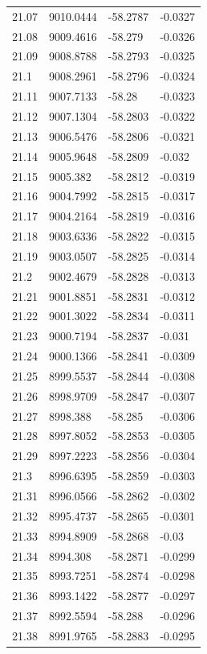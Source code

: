 \begin{table}[H]
\begin{tabular}{llll}
21.07 & 9010.0444 & -58.2787 & -0.0327 \\
21.08 & 9009.4616 & -58.279 & -0.0326 \\
21.09 & 9008.8788 & -58.2793 & -0.0325 \\
21.1 & 9008.2961 & -58.2796 & -0.0324 \\
21.11 & 9007.7133 & -58.28 & -0.0323 \\
21.12 & 9007.1304 & -58.2803 & -0.0322 \\
21.13 & 9006.5476 & -58.2806 & -0.0321 \\
21.14 & 9005.9648 & -58.2809 & -0.032 \\
21.15 & 9005.382 & -58.2812 & -0.0319 \\
21.16 & 9004.7992 & -58.2815 & -0.0317 \\
21.17 & 9004.2164 & -58.2819 & -0.0316 \\
21.18 & 9003.6336 & -58.2822 & -0.0315 \\
21.19 & 9003.0507 & -58.2825 & -0.0314 \\
21.2 & 9002.4679 & -58.2828 & -0.0313 \\
21.21 & 9001.8851 & -58.2831 & -0.0312 \\
21.22 & 9001.3022 & -58.2834 & -0.0311 \\
21.23 & 9000.7194 & -58.2837 & -0.031 \\
21.24 & 9000.1366 & -58.2841 & -0.0309 \\
21.25 & 8999.5537 & -58.2844 & -0.0308 \\
21.26 & 8998.9709 & -58.2847 & -0.0307 \\
21.27 & 8998.388 & -58.285 & -0.0306 \\
21.28 & 8997.8052 & -58.2853 & -0.0305 \\
21.29 & 8997.2223 & -58.2856 & -0.0304 \\
21.3 & 8996.6395 & -58.2859 & -0.0303 \\
21.31 & 8996.0566 & -58.2862 & -0.0302 \\
21.32 & 8995.4737 & -58.2865 & -0.0301 \\
21.33 & 8994.8909 & -58.2868 & -0.03 \\
21.34 & 8994.308 & -58.2871 & -0.0299 \\
21.35 & 8993.7251 & -58.2874 & -0.0298 \\
21.36 & 8993.1422 & -58.2877 & -0.0297 \\
21.37 & 8992.5594 & -58.288 & -0.0296 \\
21.38 & 8991.9765 & -58.2883 & -0.0295 \\

\end{tabular}
\end{table}
